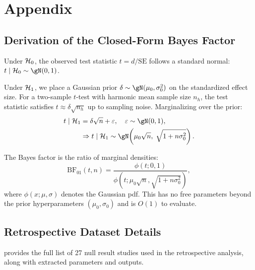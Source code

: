 \section{Appendix}
\label{sec:appendix}

\subsection{Derivation of the Closed-Form Bayes Factor}
\label{app:bf_derivation}

Under $\mathcal{H}_0$, the observed test statistic $t = d / \mathrm{SE}$ follows a
standard normal: $t \mid \Hnull \sim \gN(0, 1)$.

Under $\mathcal{H}_1$, we place a Gaussian prior $\delta \sim \gN(\mu_0, \sigma_0^2)$
on the standardized effect size. For a two-sample $t$-test with harmonic mean
sample size $n_h$, the test statistic satisfies $t \approx \delta \sqrt{n_h}$ up to
sampling noise. Marginalizing over the prior:
\begin{align}
t \mid \Halt &= \delta\sqrt{n} + \varepsilon, \quad \varepsilon \sim \gN(0,1), \\
&\Rightarrow t \mid \Halt \sim \gN\!\left(\mu_0 \sqrt{n}, \; \sqrt{1 + n\sigma_0^2}\right).
\end{align}

The Bayes factor is the ratio of marginal densities:
\begin{equation}
\mathrm{BF}_{01}(t, n) =
    \frac{\phi(t; 0, 1)}
         {\phi\!\left(t; \mu_0\sqrt{n}, \sqrt{1+n\sigma_0^2}\right)},
\end{equation}
where $\phi(x; \mu, \sigma)$ denotes the Gaussian pdf. This has no free parameters
beyond the prior hyperparameters $(\mu_0, \sigma_0)$ and is $O(1)$ to evaluate.

\subsection{Retrospective Dataset Details}
\label{app:dataset}

 provides the full list of 27 null result studies used in
the retrospective analysis, along with extracted parameters and \ours outputs.

